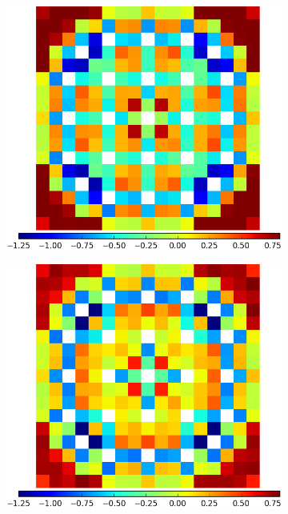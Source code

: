 \begin{figure}[h!]
\begin{subfigure}{0.45\textwidth}
\end{subfigure}%
\begin{subfigure}{0.45\textwidth}
  \centering
  \includegraphics[width=\linewidth]{figures/results/assm-31/pca-transform/capt-err-pinch-agglomerative-(2)}
  \caption{}
  \label{fig:chap11-assm-3.1-capt-pinch-2}
\end{subfigure}
\begin{subfigure}{0.45\textwidth}
  \centering
  \includegraphics[width=\linewidth]{figures/results/assm-31/pca-transform/capt-err-pinch-agglomerative-(6)}

\end{subfigure}
\end{figure}
